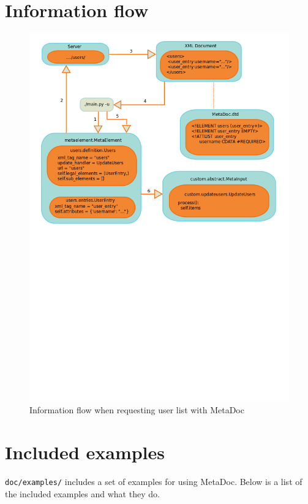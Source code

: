\documentclass[titlepage, a4paper,10pt]{article}
\begin{document}
\newpage
\section{Information flow}

\begin{figure}[h!]
    \includegraphics[width=\textwidth]{img/xml_flow}
    \caption{Information flow when requesting user list with MetaDoc}
    \label{fig:information_flow}
\end{figure}

\newpage
\section{Included examples}
\texttt{doc/examples/} includes a set of examples for using MetaDoc. Below is a
list of the included examples and what they do. 
\end{document}
